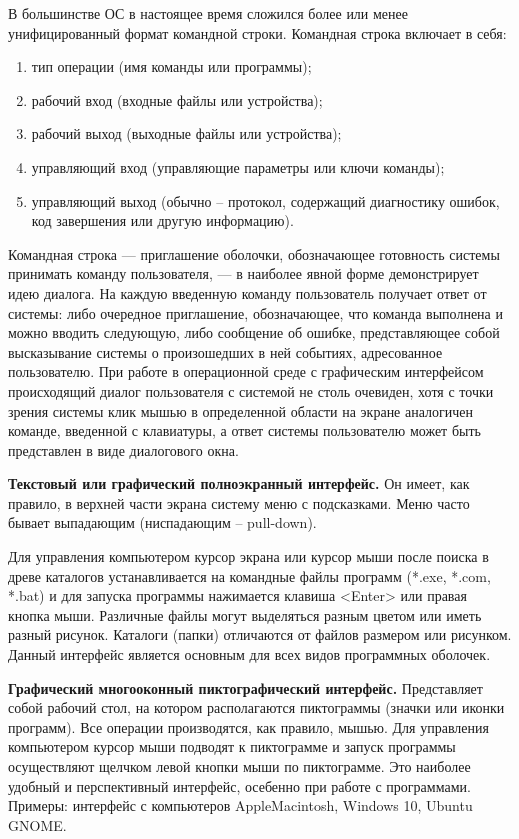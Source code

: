 \documentclass[14pt]{article}
\begin{document}
    В большинстве ОС в настоящее время сложился более или менее унифицированный формат командной строки.
    Командная строка включает в себя:
    \begin{enumerate}
        \item тип операции (имя команды или программы);
        \item рабочий вход (входные файлы или устройства);
        \item рабочий выход (выходные файлы или устройства);
        \item управляющий вход (управляющие параметры или ключи команды);
        \item управляющий выход (обычно – протокол, содержащий диагностику ошибок, код завершения или другую информацию).
    \end{enumerate}

    Командная строка --- приглашение оболочки, обозначающее готовность системы принимать команду пользователя, --- в наиболее явной форме демонстрирует идею диалога.
    На каждую введенную команду пользователь получает ответ от системы: либо очередное приглашение, обозначающее, что команда выполнена и можно вводить следующую, либо сообщение об ошибке, представляющее собой высказывание системы о произошедших в ней событиях, адресованное пользователю.
    При работе в операционной среде с графическим интерфейсом происходящий диалог пользователя с системой не столь очевиден, хотя с точки зрения системы клик мышью в определенной области на экране аналогичен команде, введенной с клавиатуры, а ответ системы пользователю может быть представлен в виде диалогового окна.

    \textbf{Текстовый или графический полноэкранный интерфейс.}
    Он имеет, как правило, в верхней части экрана систему меню с подсказками.
    Меню часто бывает выпадающим (ниспадающим – pull-down).

    Для управления компьютером курсор экрана или курсор мыши после поиска в древе каталогов устанавливается на командные файлы программ (*.exe, *.com, *.bat) и для запуска программы нажимается клавиша <Enter> или правая кнопка мыши.
    Различные файлы могут выделяться разным цветом или иметь разный рисунок.
    Каталоги (папки) отличаются от файлов размером или рисунком.
    Данный интерфейс является основным для всех видов программных оболочек.

    \textbf{Графический многооконный пиктографический интерфейс.}
    Представляет собой рабочий стол, на котором располагаются пиктограммы (значки или иконки программ).
    Все операции производятся, как правило, мышью.
    Для управления компьютером курсор мыши подводят к пиктограмме и запуск программы осуществляют щелчком левой кнопки мыши по пиктограмме.
    Это наиболее удобный и перспективный интерфейс, осебенно при работе с программами.
    Примеры: интерфейс с компьютеров AppleMacintosh, Windows 10, Ubuntu GNOME.
\end{document}
